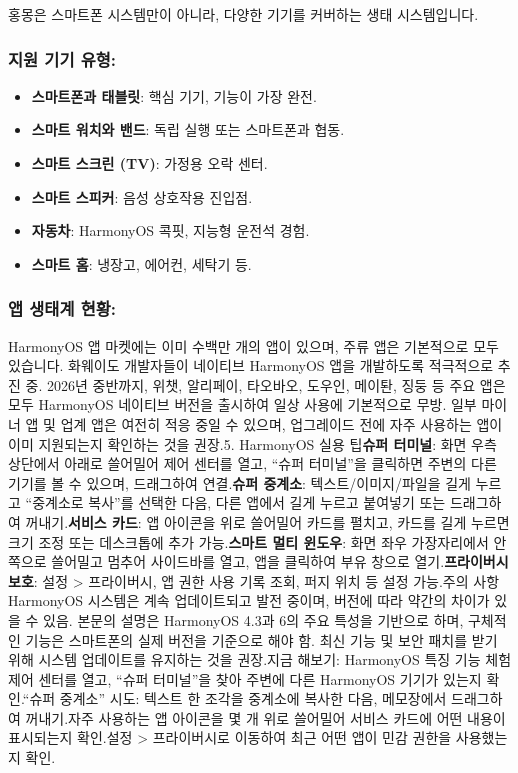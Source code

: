 
홍몽은 스마트폰 시스템만이 아니라, 다양한 기기를 커버하는 생태 시스템입니다.

\subsubsection*{지원 기기 유형:}

\begin{itemize}
  \item \textbf{스마트폰과 태블릿}: 핵심 기기, 기능이 가장 완전.
  \item \textbf{스마트 워치와 밴드}: 독립 실행 또는 스마트폰과 협동.
  \item \textbf{스마트 스크린 (TV)}: 가정용 오락 센터.
  \item \textbf{스마트 스피커}: 음성 상호작용 진입점.
  \item \textbf{자동차}: HarmonyOS 콕핏, 지능형 운전석 경험.
  \item \textbf{스마트 홈}: 냉장고, 에어컨, 세탁기 등.
\end{itemize}

\subsubsection*{앱 생태계 현황:}

HarmonyOS 앱 마켓에는 이미 수백만 개의 앱이 있으며, 주류 앱은 기본적으로 모두 있습니다. 화웨이도 개발자들이 네이티브 HarmonyOS 앱을 개발하도록 적극적으로 추진 중. 2026년 중반까지, 위챗, 알리페이, 타오바오, 도우인, 메이퇀, 징둥 등 주요 앱은 모두 HarmonyOS 네이티브 버전을 출시하여 일상 사용에 기본적으로 무방. 일부 마이너 앱 및 업계 앱은 여전히 적응 중일 수 있으며, 업그레이드 전에 자주 사용하는 앱이 이미 지원되는지 확인하는 것을 권장.5. HarmonyOS 실용 팁\textbf{슈퍼 터미널}: 화면 우측 상단에서 아래로 쓸어밀어 제어 센터를 열고, “슈퍼 터미널”을 클릭하면 주변의 다른 기기를 볼 수 있으며, 드래그하여 연결.\textbf{슈퍼 중계소}: 텍스트/이미지/파일을 길게 누르고 “중계소로 복사”를 선택한 다음, 다른 앱에서 길게 누르고 붙여넣기 또는 드래그하여 꺼내기.\textbf{서비스 카드}: 앱 아이콘을 위로 쓸어밀어 카드를 펼치고, 카드를 길게 누르면 크기 조정 또는 데스크톱에 추가 가능.\textbf{스마트 멀티 윈도우}: 화면 좌우 가장자리에서 안쪽으로 쓸어밀고 멈추어 사이드바를 열고, 앱을 클릭하여 부유 창으로 열기.\textbf{프라이버시 보호}: 설정 > 프라이버시, 앱 권한 사용 기록 조회, 퍼지 위치 등 설정 가능.주의 사항HarmonyOS 시스템은 계속 업데이트되고 발전 중이며, 버전에 따라 약간의 차이가 있을 수 있음. 본문의 설명은 HarmonyOS 4.3과 6의 주요 특성을 기반으로 하며, 구체적인 기능은 스마트폰의 실제 버전을 기준으로 해야 함. 최신 기능 및 보안 패치를 받기 위해 시스템 업데이트를 유지하는 것을 권장.지금 해보기: HarmonyOS 특징 기능 체험제어 센터를 열고, “슈퍼 터미널”을 찾아 주변에 다른 HarmonyOS 기기가 있는지 확인.“슈퍼 중계소” 시도: 텍스트 한 조각을 중계소에 복사한 다음, 메모장에서 드래그하여 꺼내기.자주 사용하는 앱 아이콘을 몇 개 위로 쓸어밀어 서비스 카드에 어떤 내용이 표시되는지 확인.설정 > 프라이버시로 이동하여 최근 어떤 앱이 민감 권한을 사용했는지 확인.
